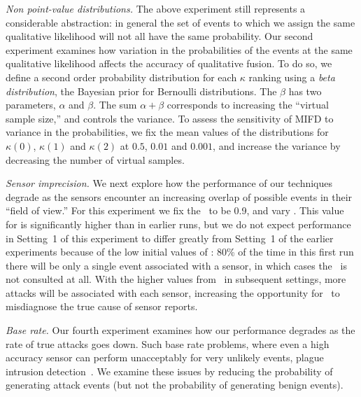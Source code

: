 \emph{Non point-value distributions.}
The above experiment still represents a considerable abstraction:  in general
the set of events to which we assign the same qualitative likelihood will not
all have the same probability.
Our second experiment examines how variation in the probabilities of the
events at the same qualitative likelihood affects the accuracy of qualitative
fusion.
To do so, we
define a second order probability distribution
for each \(\kappa\) ranking
using a \emph{beta distribution},
the Bayesian prior for Bernoulli
distributions.
The $\beta$ has two parameters, $\alpha$ and $\beta$.
The sum $\alpha+\beta$
corresponds to increasing the
``virtual sample size,'' and controls the variance.
To assess the sensitivity of MIFD to variance in the probabilities,
we fix the mean values
of the distributions for $\kappa(0)$,
$\kappa(1)$ and $\kappa(2)$ at $0.5$, $0.01$ and $0.001$,
and increase the variance by decreasing the number of virtual samples.

\emph{Sensor imprecision.}
We next explore how the performance of our techniques degrade as the
sensors encounter an increasing overlap of possible events in their
``field of view.'' 
For this experiment we fix the \sensorOverlap\ to be 0.9, and vary
\numEventProtosDetected. This value for \sensorOverlap is
significantly higher than in earlier runs, but we do not expect
performance in Setting~1 of this experiment to differ greatly from
Setting~1 of the earlier experiments because of the low initial values of
\numEventProtosDetected:  80\% of the time in this first run there will be only a single
event associated with a sensor, in which cases the \sensorOverlap\ is
not consulted at all.  With the higher
values from \numEventProtosDetected\ in subsequent settings, more
attacks will be associated with each sensor, increasing the opportunity
for \mifd\ to misdiagnose the true cause of sensor reports.

\emph{Base rate.}
Our fourth experiment examines how our performance
degrades
as the rate of true attacks goes down.
Such base rate problems, where even a high accuracy sensor can perform unacceptably
for very unlikely events, plague intrusion detection~\cite{Axelsson:1999:BFI:319709.319710}.
We examine these issues by reducing
the probability of generating attack events
(but not the probability of generating benign events). 




